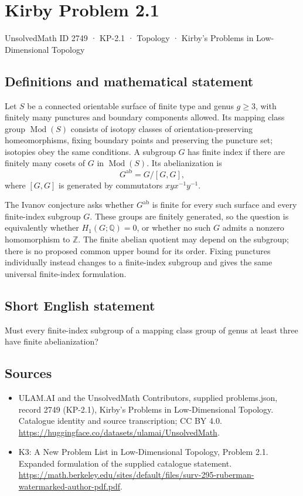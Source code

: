 \documentclass[11pt,a4paper]{article}
\begin{document}
\section*{Kirby Problem 2.1}\label{2749}
{\small UnsolvedMath ID 2749 · KP-2.1 · Topology · Kirby's Problems in Low-Dimensional Topology}
\subsection{Definitions and mathematical statement}
Let $S$ be a connected orientable surface of finite type and genus $g\geq3$,
with finitely many punctures and boundary components allowed.
Its mapping class group $\operatorname{Mod}(S)$ consists of isotopy classes of
orientation-preserving homeomorphisms, fixing boundary points and preserving
the puncture set; isotopies obey the same conditions.
A subgroup $G$ has finite index if there are finitely many cosets of $G$ in
$\operatorname{Mod}(S)$. Its abelianization is
\[
G^{\mathrm{ab}}=G/[G,G],
\]
where $[G,G]$ is generated by commutators $xyx^{-1}y^{-1}$.

The Ivanov conjecture asks whether $G^{\mathrm{ab}}$ is finite for every such
surface and every finite-index subgroup $G$.
These groups are finitely generated, so the question is equivalently whether
$H_1(G;\mathbb Q)=0$, or whether no such $G$ admits a nonzero homomorphism to
$\mathbb Z$. The finite abelian quotient may depend on the subgroup; there is
no proposed common upper bound for its order. Fixing punctures individually
instead changes to a finite-index subgroup and gives the same universal
finite-index formulation.
\subsection{Short English statement}
Must every finite-index subgroup of a mapping class group of genus at least three have finite abelianization?
\subsection{Sources}
\begin{itemize}
\item[S1] ULAM.AI and the UnsolvedMath Contributors, supplied problems.json, record 2749 (KP-2.1), Kirby's Problems in Low-Dimensional Topology. Catalogue identity and source transcription; CC BY 4.0.
\url{https://huggingface.co/datasets/ulamai/UnsolvedMath}.
\item[S2] K3: A New Problem List in Low-Dimensional Topology, Problem 2.1. Expanded formulation of the supplied catalogue statement.
\url{https://math.berkeley.edu/sites/default/files/surv-295-ruberman-watermarked-author-pdf.pdf}.
\end{itemize}
\end{document}
